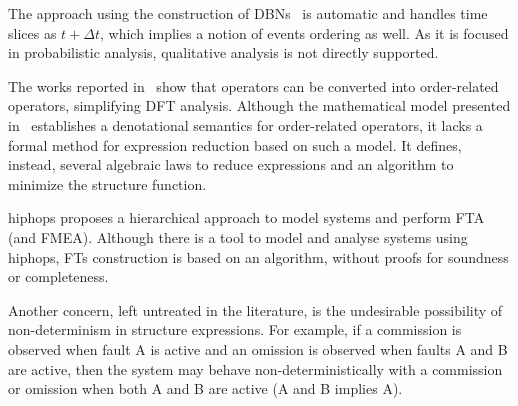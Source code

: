 \documentclass[12pt,openright,twoside,a4paper,oldfontcommands,english,brazil,final]{abntex2}
\theoremstyle{theo}
\begin{document}
The approach using the construction of \acp{DBN}~\cite{BRM+2005} is automatic and handles time slices as $t + \Delta t$, which implies a notion of events ordering as well.
As it is focused in probabilistic analysis, qualitative analysis is not directly supported.

The works reported in~\cite{Merle2010,XTD2012} show that  operators can be converted into order-related operators, simplifying \ac{DFT} analysis.
Although the mathematical model presented in~\cite{Merle2010} establishes a denotational semantics for order-related operators, it lacks a formal method for expression reduction based on such a model.
It defines, instead, several algebraic laws to reduce expressions and an algorithm to minimize the structure function.

\begin{sloppypar}
\Ac{hiphops} proposes a hierarchical approach to model systems and perform \ac{FTA} (and \ac{FMEA}).
Although there is a tool to model and analyse systems using \ac{hiphops}, \acp{FT} construction is based on an algorithm, without proofs for soundness or completeness.
\end{sloppypar}


\begin{sloppypar}
Another concern, left untreated in the literature, is the undesirable possibility of non-determinism in structure expressions.
For example, if a commission is observed when fault A is active and an omission is observed when faults A and B are active, then the system may behave non-deterministically with a commission or omission when both A and B are active (A and B implies A).
\end{sloppypar}
\end{document}
